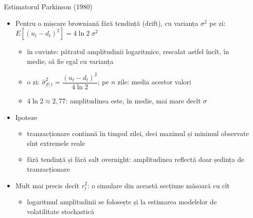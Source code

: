 \begin{frame}{Estimatorul Parkinson (1980)}
\itemsize{\small}
\begin{itemize}
    \item Pentru o mișcare browniană fără tendință (drift), cu varianța $\sigma^2$ pe zi: $E[(u_t - d_t)^2] = 4\ln 2\;\sigma^2$ 
    \begin{itemize}
        \item în cuvinte: pătratul amplitudinii logaritmice, rescalat astfel încît, în medie, să fie egal cu varianța
        \item o zi: $\hat\sigma_{P,t}^2 = \dfrac{(u_t - d_t)^2}{4\ln 2}$; pe $n$ zile: media acestor valori
        \item $4\ln 2 \approx 2{,}77$: amplitudinea este, în medie, mai mare decît $\sigma$
    \end{itemize}
    \item Ipoteze
    \begin{itemize}
        \item tranzacționare continuă în timpul zilei, deci maximul și minimul observate sînt extremele reale
        \item fără tendință și fără salt overnight: amplitudinea reflectă doar ședința de tranzacționare
    \end{itemize}
    \item Mult mai precis decît $r_t^2$: o simulare din această secțiune măsoară cu cît
    \begin{itemize}
        \item logaritmul amplitudinii se folosește și la estimarea modelelor de volatilitate stochastică 
    \end{itemize}
\end{itemize}
\end{frame}

